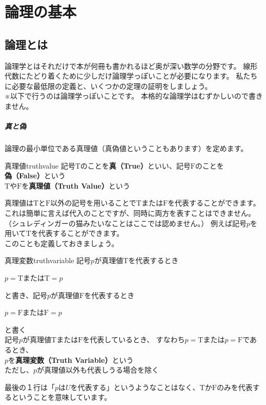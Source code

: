 \documentclass[report]{jlreq}%
\newcounter{myso}
\begin{document}
\chapter{論理の基本}
\section{論理とは}
論理学とはそれだけで本が何冊も書かれるほど奥が深い数学の分野です。
線形代数にたどり着くために少しだけ論理学っぽいことが必要になります。
私たちに必要な最低限の定義と、いくつかの定理の証明をしましょう。\\
※以下で行うのは論理学っぽいことです。
本格的な論理学はむずかしいので書きません。

\paragraph*{真と偽} 
論理の最小単位である真理値（真偽値ということもあります）を定めます。

\begin{mysodef}{真理値}{truthvalue}
	記号$\mathrm{T}$のことを\textbf{真（True）}といい、記号$\mathrm{F}$のことを\textbf{偽（False）}という\\
	$\mathrm{T}$や$\mathrm{F}$を\textbf{真理値（Truth Value）}という
\end{mysodef}

真理値は$\mathrm{T}$と$\mathrm{F}$以外の記号を用いることで$\mathrm{T}$または$\mathrm{F}$を代表することができます。
これは簡単に言えば代入のことですが、同時に両方を表すことはできません。
（シュレディンガーの猫みたいなことはここでは認めません。）
例えば記号$p$を用いて$\mathrm{T}$を代表することができます。\\
このことも定義しておきましょう。

\begin{mysodef}{真理変数}{truthvariable}
	記号$p$が真理値$\mathrm{T}$を代表するとき
	\begin{center}
		$p=\mathrm{T}$\quad{}または\quad{}$\mathrm{T}=p$\\
	\end{center}
	と書き、記号$p$が真理値$\mathrm{F}$を代表するとき
	\begin{center}
		$p=\mathrm{F}$\quad{}または\quad{}$\mathrm{F}=p$\\
	\end{center}
	と書く\\
	記号$p$が真理値$\mathrm{T}$または$\mathrm{F}$を代表しているとき、
	すなわち$p=\mathrm{T}$または$p=\mathrm{F}$であるとき、\\
	$p$を\textbf{真理変数（Truth Variable）}という\\
	ただし、$p$が真理値以外も代表しうる場合を除く
\end{mysodef}
最後の１行は「$p$は$U$を代表する」というようなことはなく、$\mathrm{T}$か$\mathrm{F}$のみを代表するということを意味しています。
\end{document}
